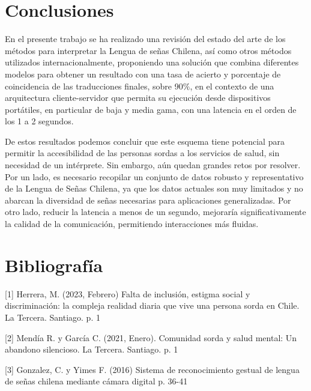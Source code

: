\documentclass[10pt]{article}
\begin{document}
\vspace{1\baselineskip}
\newpage
\section{Conclusiones}

\vspace{1\baselineskip}
En el presente trabajo se ha realizado una revisión del estado del arte de los métodos para interpretar la Lengua de señas Chilena, así como otros métodos utilizados internacionalmente, proponiendo una solución que combina diferentes modelos para obtener un resultado con una tasa de acierto y porcentaje de coincidencia de las traducciones finales, sobre 90$\%$, en el contexto de una arquitectura cliente-servidor que permita su ejecución desde dispositivos portátiles, en particular de baja y media gama, con una latencia en el orden de los 1 a 2 segundos.

\vspace{1\baselineskip}
De estos resultados podemos concluir que este esquema tiene potencial para permitir la accesibilidad de las personas sordas a los servicios de salud, sin necesidad de un intérprete. Sin embargo, aún quedan grandes retos por resolver. Por un lado, es necesario recopilar un conjunto de datos robusto y representativo de la Lengua de Señas Chilena, ya que los datos actuales son muy limitados y no abarcan la diversidad de señas necesarias para aplicaciones generalizadas. Por otro lado, reducir la latencia a menos de un segundo, mejoraría significativamente la calidad de la comunicación, permitiendo interacciones más fluidas.

\vspace{3\baselineskip}
\section{Bibliografía}

\vspace{1\baselineskip}
[1] Herrera, M. (2023, Febrero) Falta de inclusión, estigma social y discriminación: la compleja realidad diaria que vive una persona sorda en Chile. La Tercera. Santiago. p. 1

\vspace{1\baselineskip}
[2] Mendía R. y García C. (2021, Enero). Comunidad sorda y salud mental: Un abandono silencioso. La Tercera. Santiago. p. 1

\vspace{1\baselineskip}
[3] Gonzalez, C. y Yimes F. (2016) Sistema de reconocimiento gestual de lengua de señas chilena mediante cámara digital p. 36-41
\end{document}
